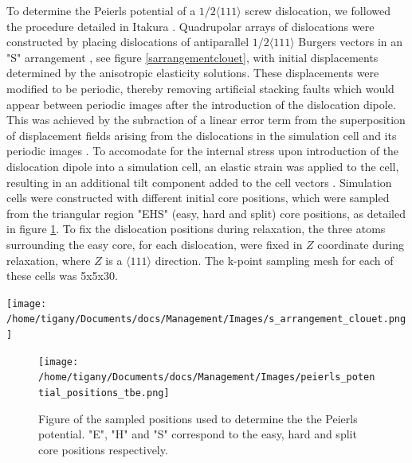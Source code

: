 \documentclass[a4paper,11pt]{article}
\begin{document}
To determine the Peierls potential of a \(1/2\langle 111 \rangle\) screw dislocation, we followed the procedure
detailed in Itakura \cite{Itakura2012}. Quadrupolar arrays of dislocations were constructed by
placing dislocations of antiparallel \(1/2\langle 111\rangle\) Burgers vectors in an "S" arrangement
\cite{Clouet2012}, see figure \ref{sarrangementclouet}, with initial displacements determined by the
anisotropic elasticity solutions. These displacements were modified to be periodic, thereby
removing artificial stacking faults which would appear between periodic images after the
introduction of the dislocation dipole. This was achieved by the subraction of a linear error
term from the superposition of displacement fields arising from the dislocations in the
simulation cell and its periodic images \cite{vasilybulatov2006}. To accomodate for the internal
stress upon introduction of the dislocation dipole into a simulation cell, an elastic strain was
applied to the cell, resulting in an additional tilt component added to the cell vectors
\cite{Clouet2012,vasilybulatov2006}. Simulation cells were constructed with different initial core
positions, which were sampled from the triangular region "EHS" (easy, hard and split) core
positions, as detailed in figure \ref{sampledpositions}. To fix the dislocation positions during
relaxation, the three atoms surrounding the easy core, for each dislocation, were fixed in \(Z\)
coordinate during relaxation, where \(Z\) is a \(\langle 111 \rangle\) direction. The k-point sampling mesh for
each of these cells was 5x5x30.


\begin{center}
\texttt{[image: /home/tigany/Documents/docs/Management/Images/s\_arrangement\_clouet.png]}
\end{center}


\begin{figure}[htbp]
\centering
\texttt{[image: /home/tigany/Documents/docs/Management/Images/peierls\_potential\_positions\_tbe.png]}
\caption{Figure of the sampled positions used to determine the the Peierls potential. "E", "H" and "S" correspond to the easy, hard and split core positions respectively. \label{sampledpositions}}
\end{figure}
\end{document}
